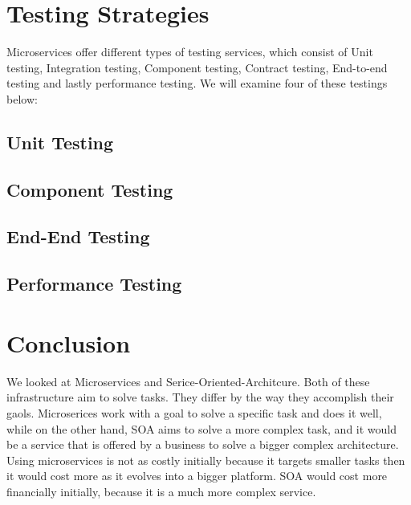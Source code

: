 \documentclass{IEEEtran}
\begin{document}
	\section{Testing Strategies}
		Microservices offer different types of testing services, which consist of Unit testing, Integration testing, Component testing, Contract testing, End-to-end testing and lastly performance testing. We will examine four of these testings below: 
		\subsection{Unit Testing}
		\subsection{Component Testing}
		\subsection{End-End Testing}
		\subsection{Performance Testing}

	\section{Conclusion}
		We looked at Microservices and Serice-Oriented-Architcure. Both of these infrastructure aim to solve tasks. They differ by the way they accomplish their gaols. Microserices work with a goal to solve a specific task and does it well, while on the other hand, SOA aims to solve a more complex task, and it would be a service that is offered by a business to solve a bigger complex architecture. Using microservices is not as costly initially because it targets smaller tasks then it would cost more as it evolves into a bigger platform. SOA would cost more financially initially, because it is a much more complex service. 




	\newpage
	
	
\end{document}
